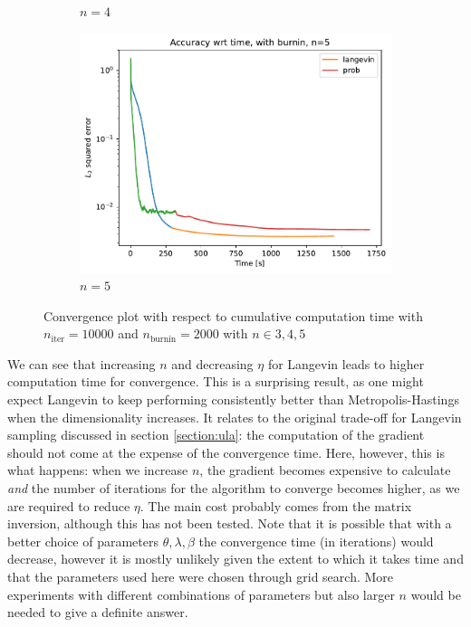\documentclass[12pt]{memoir}
\newcommand{\nitern}[1]{$n_{\text{iter}}=#1$}
\newcommand{\nburninn}[1]{$n_{\text{burnin}}=#1$}
\begin{document}
\begin{figure}[H]
\begin{subfigure}[b]{0.49\textwidth}
        \caption{$n=4$}
        \label{fig:conv-plot-time-diff-n-4-sub}
    \end{subfigure}
    \begin{subfigure}[b]{0.49\textwidth}
        \centering
        \includegraphics[width=\textwidth]{figures/experiments/baseline/diff_n_qubits/iters_acc_comp_time_no_avg_n5-1.png}
        \caption{$n=5$}
        \label{fig:conv-plot-time-diff-n-5-sub}
    \end{subfigure}
    \caption{Convergence plot with respect to cumulative computation time with \nitern{10000} and \nburninn{2000} with $n\in{3,4,5}$}
    \label{fig:conv-plot-time-diff-n}
\end{figure}

We can see that increasing $n$ and decreasing $\eta$ for Langevin leads to higher computation time for convergence. This is a surprising result, as one might expect Langevin to keep performing consistently better than Metropolis-Hastings when the dimensionality increases. It relates to the original trade-off for Langevin sampling discussed in section \ref{section:ula}: the computation of the gradient should not come at the expense of the convergence time. Here, however, this is what happens: when we increase $n$, the gradient becomes expensive to calculate \textit{and} the number of iterations for the algorithm to converge becomes higher, as we are required to reduce $\eta$. The main cost probably comes from the matrix inversion, although this has not been tested. Note that it is possible that with a better choice of parameters $\theta,\lambda,\beta$ the convergence time (in iterations) would decrease, however it is mostly unlikely given the extent to which it takes time and that the parameters used here were chosen through grid search. More experiments with different combinations of parameters but also larger $n$ would be needed to give a definite answer.\medbreak
\end{document}
